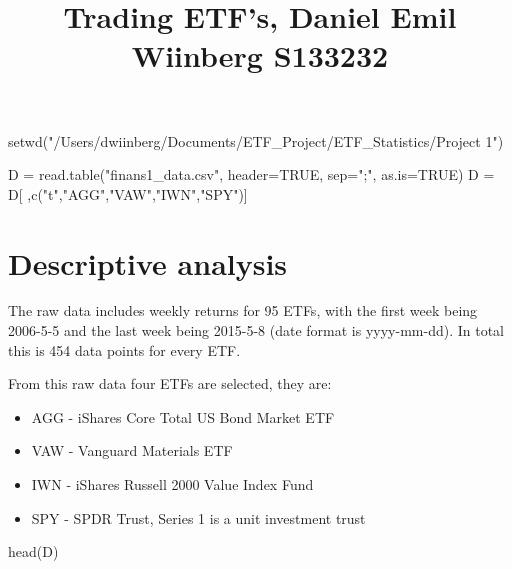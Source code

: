 \documentclass[
]{article}
\title{Trading ETF's, Daniel Emil Wiinberg S133232}
\author{}
\date{\vspace{-2.5em}}
\newenvironment{Shaded}{\begin{snugshade}}{\end{snugshade}}
\newcommand{\AttributeTok}[1]{\textcolor[rgb]{0.77,0.63,0.00}{#1}}
\newcommand{\ConstantTok}[1]{\textcolor[rgb]{0.00,0.00,0.00}{#1}}
\newcommand{\FunctionTok}[1]{\textcolor[rgb]{0.00,0.00,0.00}{#1}}
\newcommand{\NormalTok}[1]{#1}
\newcommand{\OtherTok}[1]{\textcolor[rgb]{0.56,0.35,0.01}{#1}}
\newcommand{\StringTok}[1]{\textcolor[rgb]{0.31,0.60,0.02}{#1}}
\providecommand{\tightlist}{%
  \setlength{\itemsep}{0pt}\setlength{\parskip}{0pt}}
\begin{document}
\maketitle

\begin{Shaded}
\begin{Highlighting}[]
\FunctionTok{setwd}\NormalTok{(}\StringTok{"/Users/dwiinberg/Documents/ETF\_Project/ETF\_Statistics/Project 1"}\NormalTok{)}
\end{Highlighting}
\end{Shaded}

\begin{Shaded}
\begin{Highlighting}[]
\NormalTok{D }\OtherTok{=} \FunctionTok{read.table}\NormalTok{(}\StringTok{"finans1\_data.csv"}\NormalTok{, }\AttributeTok{header=}\ConstantTok{TRUE}\NormalTok{, }\AttributeTok{sep=}\StringTok{";"}\NormalTok{, }\AttributeTok{as.is=}\ConstantTok{TRUE}\NormalTok{)}
\NormalTok{D }\OtherTok{=}\NormalTok{ D[ ,}\FunctionTok{c}\NormalTok{(}\StringTok{"t"}\NormalTok{,}\StringTok{"AGG"}\NormalTok{,}\StringTok{"VAW"}\NormalTok{,}\StringTok{"IWN"}\NormalTok{,}\StringTok{"SPY"}\NormalTok{)]}
\end{Highlighting}
\end{Shaded}

\section{Descriptive analysis}

The raw data includes weekly returns for 95 ETFs, with the first week
being 2006-5-5 and the last week being 2015-5-8 (date format is
yyyy-mm-dd). In total this is 454 data points for every ETF.

From this raw data four ETFs are selected, they are:

\begin{itemize}
\tightlist
\item
  AGG - iShares Core Total US Bond Market ETF
\item
  VAW - Vanguard Materials ETF
\item
  IWN - iShares Russell 2000 Value Index Fund
\item
  SPY - SPDR Trust, Series 1 is a unit investment trust
\end{itemize}

\begin{Shaded}
\begin{Highlighting}[]
\FunctionTok{head}\NormalTok{(D)}
\end{Highlighting}
\end{Shaded}
\end{document}
